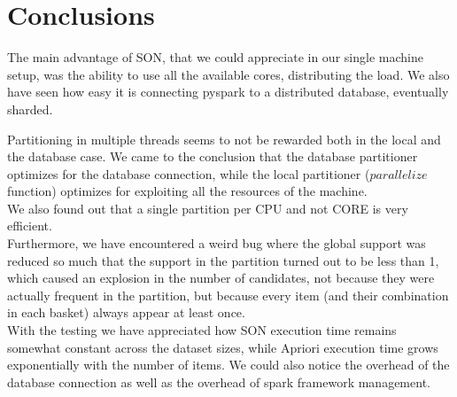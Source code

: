 \documentclass[a4paper]{article}
\begin{document}
	
	\section{Conclusions}
	The main advantage of SON, that we could appreciate in our single machine setup, was the ability to use all the available cores, distributing the load. We also have seen how easy it is connecting pyspark 
	to a distributed database, eventually sharded.
	
	Partitioning in multiple threads seems to not be rewarded both in the local and the database case. We came to the conclusion that the database partitioner optimizes for the database connection, 
	while the local partitioner ($parallelize$ function) optimizes for exploiting all the resources of the machine.\\
	We also found out that a single partition per CPU and not CORE is very efficient.\\
	Furthermore, we have encountered a weird bug where the global support was reduced so much that the support in the partition
	turned out to be less than 1, which caused an explosion in the number of candidates, not because they were actually frequent
	in the partition, but because every item (and their combination in each basket) always appear at least once.\\

	With the testing we have appreciated how SON execution time remains somewhat constant across the dataset sizes, while Apriori execution time grows exponentially with the number of items.
	We could also notice the overhead of the database connection as well as the overhead of spark framework management.
		
\end{document}
